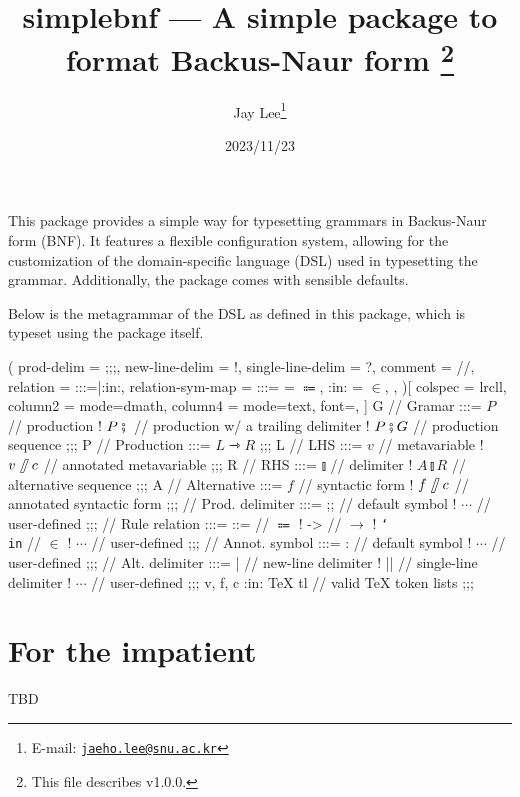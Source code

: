 \documentclass[a4paper]{article}
\title{%
  \textsf{simplebnf} --- A simple package to format Backus-Naur form%
  \footnote{This file describes v1.0.0.}}
\author{Jay Lee\footnote{E-mail: %
  \href{mailto:jaeho.lee@snu.ac.kr}{\texttt{jaeho.lee@snu.ac.kr}}}}
\date{2023/11/23}
\begin{document}
\maketitle


\vfill
This package provides a simple way for typesetting grammars in Backus-Naur form (BNF).
It features a flexible configuration system, allowing for the customization of the domain-specific language (DSL) used in typesetting the grammar.
Additionally, the package comes with sensible defaults.

Below is the metagrammar of the DSL as defined in this package, which is typeset using the package itself.
\begin{tcolorbox}[breakable]
  \begin{bnf}(
    prod-delim = ;;;,
    new-line-delim = !,
    single-line-delim = ?,
    comment = //,
    relation = {:::=|:in:},
    relation-sym-map =
      {
        {:::=} = $\Coloneqq$,
        {:in:} = $\in$,
      },
  )[
    colspec = lrcll,
    column{2} = {mode=dmath},
    column{4} = {mode=text, font=\ttfamily},
  ]
    G // Gramar :::=
      $P$ // production
    ! $P \fatsemi {}$ // production w/ a trailing delimiter
    ! $P \fatsemi G$ // production sequence
  ;;;
    P // Production :::= $L \rightarrowtriangle R$
  ;;;
    L // LHS :::=
      $v$ // metavariable
    ! $v\!\fatslash\,c$ // annotated metavariable
  ;;;
    R // RHS :::=
      $\talloblong$ // delimiter
    ! $A \talloblong R$ // alternative sequence
  ;;;
    A // Alternative :::=
      $f$ // syntactic form
    ! $f\!\fatslash\,c$ // annotated syntactic form
  ;;;
    \fatsemi // Prod. delimiter :::=
      ;; // default symbol
    ! $\cdots$ // user-defined
  ;;;
    \rightarrowtriangle // Rule relation :::=
      ::= // $\Coloneqq$
    ! -> // $\to$
    ! \texttt{\char`\\in} // $\in$
    ! $\cdots$ // user-defined
  ;;;
    \fatslash // Annot. symbol :::=
      : // default symbol
    ! $\cdots$ // user-defined
  ;;;
    \talloblong // Alt. delimiter :::=
      | // new-line delimiter
    ! || // single-line delimiter
    ! $\cdots$ // user-defined
  ;;;
    v, f, c :in: \textsf{\TeX{} tl} // valid \TeX{} token lists
  ;;;
  \end{bnf}
\end{tcolorbox}
\vfill

\section{For the impatient}
TBD
\end{document}
